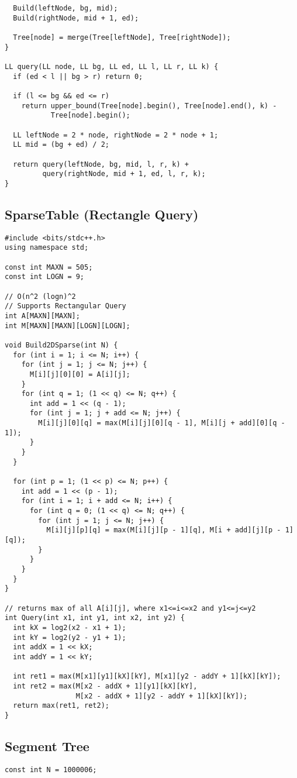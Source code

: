 \documentclass[FSZ,a4paper,onesided]{article}
\begin{document}
\begin{multicols*}{\COLS}
\begin{lstlisting}
  Build(leftNode, bg, mid);
  Build(rightNode, mid + 1, ed);

  Tree[node] = merge(Tree[leftNode], Tree[rightNode]);
}

LL query(LL node, LL bg, LL ed, LL l, LL r, LL k) {
  if (ed < l || bg > r) return 0;

  if (l <= bg && ed <= r)
    return upper_bound(Tree[node].begin(), Tree[node].end(), k) -
           Tree[node].begin();

  LL leftNode = 2 * node, rightNode = 2 * node + 1;
  LL mid = (bg + ed) / 2;

  return query(leftNode, bg, mid, l, r, k) +
         query(rightNode, mid + 1, ed, l, r, k);
}
\end{lstlisting}
\subsection{SparseTable (Rectangle Query)}
\begin{lstlisting}
#include <bits/stdc++.h>
using namespace std;

const int MAXN = 505;
const int LOGN = 9;

// O(n^2 (logn)^2
// Supports Rectangular Query
int A[MAXN][MAXN];
int M[MAXN][MAXN][LOGN][LOGN];

void Build2DSparse(int N) {
  for (int i = 1; i <= N; i++) {
    for (int j = 1; j <= N; j++) {
      M[i][j][0][0] = A[i][j];
    }
    for (int q = 1; (1 << q) <= N; q++) {
      int add = 1 << (q - 1);
      for (int j = 1; j + add <= N; j++) {
        M[i][j][0][q] = max(M[i][j][0][q - 1], M[i][j + add][0][q - 1]);
      }
    }
  }

  for (int p = 1; (1 << p) <= N; p++) {
    int add = 1 << (p - 1);
    for (int i = 1; i + add <= N; i++) {
      for (int q = 0; (1 << q) <= N; q++) {
        for (int j = 1; j <= N; j++) {
          M[i][j][p][q] = max(M[i][j][p - 1][q], M[i + add][j][p - 1][q]);
        }
      }
    }
  }
}

// returns max of all A[i][j], where x1<=i<=x2 and y1<=j<=y2
int Query(int x1, int y1, int x2, int y2) {
  int kX = log2(x2 - x1 + 1);
  int kY = log2(y2 - y1 + 1);
  int addX = 1 << kX;
  int addY = 1 << kY;

  int ret1 = max(M[x1][y1][kX][kY], M[x1][y2 - addY + 1][kX][kY]);
  int ret2 = max(M[x2 - addX + 1][y1][kX][kY],
                 M[x2 - addX + 1][y2 - addY + 1][kX][kY]);
  return max(ret1, ret2);
}
\end{lstlisting}
\subsection{Segment Tree}
\begin{lstlisting}
const int N = 1000006;


\end{lstlisting}
\end{multicols*}
\end{document}
